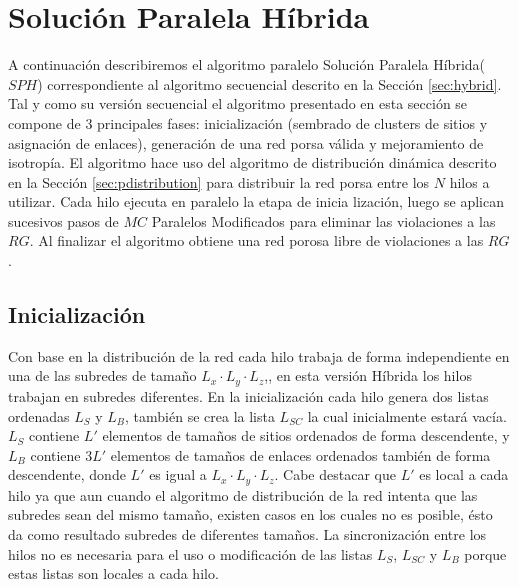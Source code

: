 \section{Solución Paralela Híbrida}
\label{sec:ph}
A continuación describiremos el algoritmo paralelo Solución Paralela Híbrida($SPH$) correspondiente al algoritmo secuencial descrito en la Sección \ref{sec:hybrid}. Tal y como su versión secuencial el algoritmo presentado en esta sección se compone de 3 principales fases: inicialización (sembrado de clusters de sitios y asignación de enlaces), generación de una red porsa válida y mejoramiento de isotropía. El algoritmo hace uso  del algoritmo de distribución dinámica descrito en la Sección \ref{sec:pdistribution} para distribuir la red porsa entre los $N$ hilos  a utilizar. Cada hilo ejecuta en paralelo la etapa de inicia	lización, luego  se aplican sucesivos pasos de $MC$ Paralelos Modificados para eliminar  las violaciones a las $RG$. Al finalizar el algoritmo obtiene una red porosa libre de violaciones a las $RG$.

\subsection{Inicialización}
\label{subsec:pinit}
Con base en la distribución de la red cada hilo trabaja de forma independiente en una de las subredes de tamaño $L_x \cdot L_y \cdot L_z$,, en esta versión Híbrida los hilos trabajan en subredes diferentes.  En la inicialización cada hilo genera dos listas ordenadas $L_S$ y $L_B$, también se crea la lista $L_{SC}$ la cual inicialmente estará vacía.  $L_S$ contiene $L'$ elementos de tamaños de sitios ordenados de forma descendente, y $L_B$ contiene $3L'$ elementos de tamaños de enlaces  ordenados también de forma descendente, donde $L'$ es igual a $L_x \cdot L_y \cdot L_z$. Cabe destacar que $L'$ es local a cada hilo  ya que aun cuando el algoritmo de distribución de la red intenta que las subredes sean del mismo tamaño, existen casos en los cuales  no es posible, ésto da como resultado subredes de diferentes tamaños. La sincronización entre los hilos no es necesaria para  el uso o modificación de las listas $L_S$, $L_{SC}$ y $L_B$ porque estas listas son locales a cada hilo.

